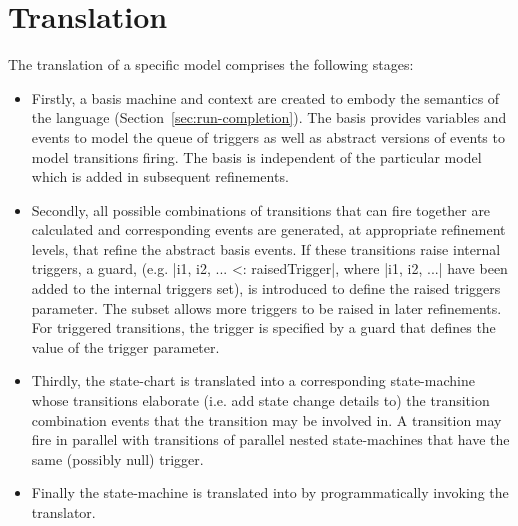 
\section{\SCXML Translation}
\label{sec:translation}
The translation of a specific \SCXML model comprises the following stages: 
\begin{itemize}
	\item 
Firstly, a basis machine and context are created to embody the semantics of the \SCXML language (Section~\ref{sec:run-completion}).
The basis provides variables and events to model the queue of triggers as well as abstract versions of events to model transitions firing.
The basis is independent of the particular \SCXML model which is added in subsequent refinements.
	\item 
Secondly, all possible combinations of transitions that can fire together are calculated and corresponding events are generated, at appropriate refinement levels, that refine the abstract basis events.  
If these transitions raise internal triggers, a guard, (e.g. |{i1, i2, ...} <: raisedTrigger|, where |i1, i2, ...| have been added to the internal triggers set), is introduced to define the raised triggers parameter. 
The subset allows more triggers to be raised in later refinements.
For triggered transitions, the trigger is specified by a guard that defines the value of the trigger parameter. 
	\item 
Thirdly, the \SCXML state-chart is translated into a corresponding \UMLB state-machine whose transitions elaborate (i.e. add state change details to) the transition combination events that the transition may be involved in.
A transition may fire in parallel with transitions of parallel nested state-machines that have the same (possibly null) trigger.
	\item
Finally the \UMLB state-machine is translated into \EVENTB by programmatically invoking the \UMLB translator.
\end{itemize}


